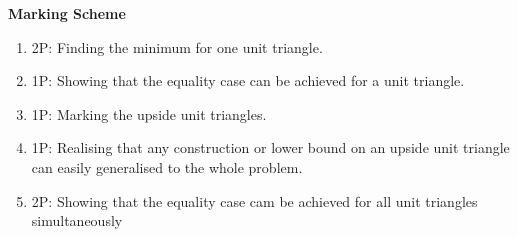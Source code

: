 {\textbf{Marking Scheme}
\begin{enumerate}
\item 2P: Finding the minimum for one unit triangle. 
\item 1P: Showing that the equality case can be achieved for a unit triangle. 
\item 1P: Marking the upside unit triangles. 
\item 1P: Realising that any construction or lower bound on an upside unit triangle can easily generalised to the whole problem.
\item 2P: Showing that the equality case cam be achieved for all unit triangles simultaneously 
\end{enumerate}
}